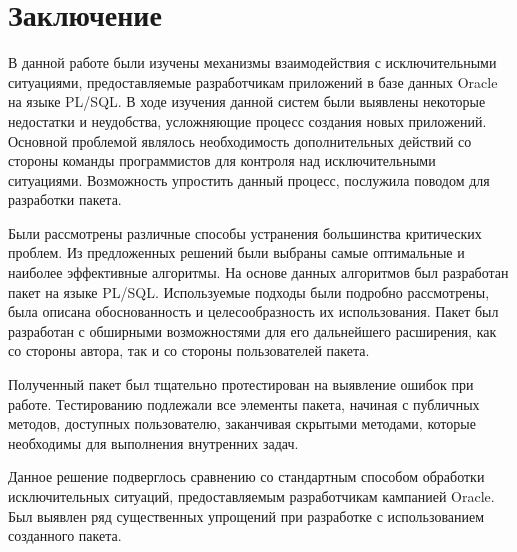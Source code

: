 \chapter*{Заключение} \label{ch-conclusion}

В данной работе были изучены механизмы взаимодействия с исключительными ситуациями, предоставляемые разработчикам приложений в базе данных Oracle на языке PL/SQL. В ходе изучения данной систем были выявлены некоторые недостатки и неудобства, усложняющие процесс создания новых приложений. Основной проблемой являлось необходимость дополнительных действий со стороны команды программистов для контроля над исключительными ситуациями. Возможность упростить данный процесс, послужила поводом для разработки пакета.
 
Были рассмотрены различные способы устранения большинства критических проблем. Из предложенных решений были выбраны самые оптимальные и наиболее эффективные алгоритмы. На основе данных алгоритмов был разработан пакет на языке PL/SQL. Используемые подходы были подробно рассмотрены, была описана обоснованность и целесообразность их использования. Пакет был разработан с обширными возможностями для его дальнейшего расширения, как со стороны автора, так и со стороны пользователей пакета. 

Полученный пакет был тщательно протестирован на выявление ошибок при работе. Тестированию подлежали все элементы пакета, начиная с публичных методов, доступных пользователю, заканчивая скрытыми методами, которые необходимы для выполнения внутренних задач.
 
Данное решение подверглось сравнению со стандартным способом обработки исключительных ситуаций, предоставляемым разработчикам кампанией Oracle. Был выявлен ряд существенных упрощений при разработке с использованием созданного пакета. 


